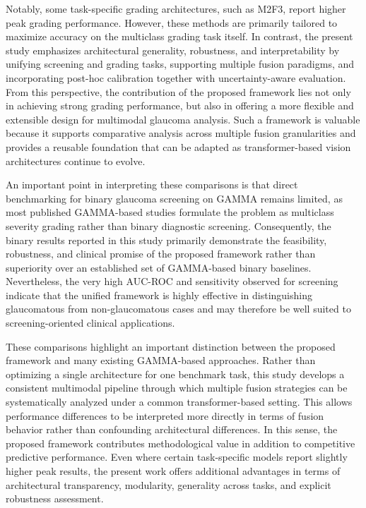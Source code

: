 \documentclass[preprint,12pt]{elsarticle}
\begin{document}
Notably, some task-specific grading architectures, such as M2F3, report higher peak grading performance. However, these methods are primarily tailored to maximize accuracy on the multiclass grading task itself. In contrast, the present study emphasizes architectural generality, robustness, and interpretability by unifying screening and grading tasks, supporting multiple fusion paradigms, and incorporating post-hoc calibration together with uncertainty-aware evaluation. From this perspective, the contribution of the proposed framework lies not only in achieving strong grading performance, but also in offering a more flexible and extensible design for multimodal glaucoma analysis. Such a framework is valuable because it supports comparative analysis across multiple fusion granularities and provides a reusable foundation that can be adapted as transformer-based vision architectures continue to evolve.

An important point in interpreting these comparisons is that direct benchmarking for binary glaucoma screening on GAMMA remains limited, as most published GAMMA-based studies formulate the problem as multiclass severity grading rather than binary diagnostic screening. Consequently, the binary results reported in this study primarily demonstrate the feasibility, robustness, and clinical promise of the proposed framework rather than superiority over an established set of GAMMA-based binary baselines. Nevertheless, the very high AUC-ROC and sensitivity observed for screening indicate that the unified framework is highly effective in distinguishing glaucomatous from non-glaucomatous cases and may therefore be well suited to screening-oriented clinical applications.

These comparisons highlight an important distinction between the proposed framework and many existing GAMMA-based approaches. Rather than optimizing a single architecture for one benchmark task, this study develops a consistent multimodal pipeline through which multiple fusion strategies can be systematically analyzed under a common transformer-based setting. This allows performance differences to be interpreted more directly in terms of fusion behavior rather than confounding architectural differences. In this sense, the proposed framework contributes methodological value in addition to competitive predictive performance. Even where certain task-specific models report slightly higher peak results, the present work offers additional advantages in terms of architectural transparency, modularity, generality across tasks, and explicit robustness assessment.
\end{document}
